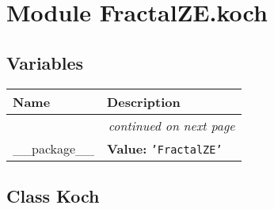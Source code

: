 %
%
%


\section{Module FractalZE.koch}

    \label{FractalZE:koch}


  \subsection{Variables}

    \vspace{-1cm}
\hspace{\varindent}\begin{longtable}{|p{\varnamewidth}|p{\vardescrwidth}|l}
\cline{1-2}
\cline{1-2} \centering \textbf{Name} & \centering \textbf{Description}& \\
\cline{1-2}
\endhead\cline{1-2}\multicolumn{3}{r}{\small\textit{continued on next page}}\\\endfoot\cline{1-2}
\endlastfoot\raggedright \_\-\_\-p\-a\-c\-k\-a\-g\-e\-\_\-\_\- & \raggedright \textbf{Value:} 
{\tt \texttt{'}\texttt{FractalZE}\texttt{'}}&\\
\cline{1-2}
\end{longtable}



\subsection{Class Koch}

